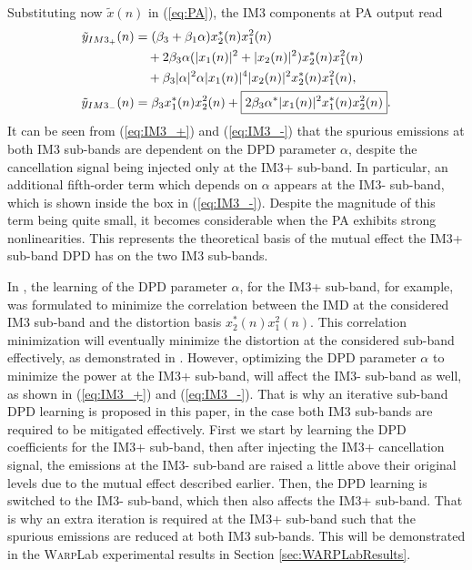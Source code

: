 \documentclass[9pt,conference]{IEEEtran}
\begin{document}
\begin{spacing}{0.88}
Substituting now $\tilde{x}(n)$ in (\ref{eq:PA}), the IM3 components at PA output read
\begin{align}
\small
\tilde{y}_{IM3_+}(n) &= (\beta_3 + \beta_1 \alpha) x_2^*(n) x_1^2(n) \nonumber\\
& \quad + 2 \beta_3 \alpha (|x_1(n)|^2 + |x_2(n)|^2) x_2^*(n) x_1^2(n) \nonumber\\ 
& \quad + \beta_3 |\alpha|^2 \alpha |x_1(n)|^4 |x_2(n)|^2 x_2^*(n) x_1^2(n), \label{eq:IM3_+}\\
\tilde{y}_{IM3_-}(n) &=  \beta_3 x_1^*(n) x_2^2(n) + \boxed{2 \beta_3 \alpha^* |x_1(n)|^2 x_1^*(n) x_2^2(n)}. \label{eq:IM3_-}
\end{align}
\normalsize
It can be seen from (\ref{eq:IM3_+}) and (\ref{eq:IM3_-}) that the spurious emissions at both IM3 sub-bands are dependent on the DPD parameter $\alpha$, despite the cancellation signal being injected only at the IM3+ sub-band. In particular, an additional fifth-order term which depends on $\alpha$ appears at the IM3- sub-band, which is shown inside the box in (\ref{eq:IM3_-}). Despite the magnitude of this term being quite small, it becomes considerable when the PA exhibits strong nonlinearities. This represents the theoretical basis of the mutual effect the IM3+ sub-band DPD has on the two IM3 sub-bands.

In \cite{ICASSP2014}, the learning of the DPD parameter $\alpha$, for the IM3+ sub-band, for example, was formulated to minimize the correlation between the IMD at the considered IM3 sub-band and the distortion basis $x_2^*(n)x_1^2(n)$. This correlation minimization will eventually minimize the distortion at the considered sub-band effectively, as demonstrated in \cite{ICASSP2014,Asilomar2015}. However, optimizing the DPD parameter $\alpha$ to minimize the power at the IM3+ sub-band, will affect the IM3- sub-band as well, as shown in (\ref{eq:IM3_+}) and (\ref{eq:IM3_-}). That is why an iterative sub-band DPD learning is proposed in this paper, in the case both IM3 sub-bands are required to be mitigated effectively. First we start by learning the DPD coefficients for the IM3+ sub-band, then after injecting the IM3+ cancellation signal, the emissions at the IM3- sub-band are raised a little above their original levels due to the mutual effect described earlier. Then, the DPD learning is switched to the IM3- sub-band, which then also affects the IM3+ sub-band. That is why an extra iteration is required at the IM3+ sub-band such that the spurious emissions are reduced at both IM3 sub-bands. This will be demonstrated in the \textsc{Warp}Lab experimental results in Section \ref{sec:WARPLabResults}.


\end{spacing}
\end{document}
